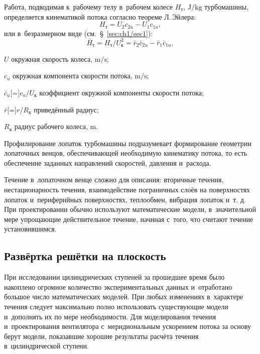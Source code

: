 Работа, подводимая к~рабочему телу в~рабочем колесе \(H_\text{т}\), \(\si\joule/\si\kilogram\) турбомашины, определяется кинематикой потока согласно теореме Л.\,Эйлера:
\begin{equation}
	H_\text{т} = U_2 c_{2u} - U_1 c_{1u},
	\label{eq:HtEuler}
\end{equation}
или в~безразмерном виде (см.~\S~\ref{sec:ch1/sec1}):
\begin{equation}
	\bar{H}_\text{т} = H_\text{т}/U_\text{к}^2 = \bar{r}_2 \bar{c}_{2u} - \bar{r}_1 \bar{c}_{1u},
	\label{eq:H_t}
\end{equation}
\begin{eqexpl}
	\item{\(U\)} окружная скорость колеса, \(\si\meter/\si\second\);
	\item{\(c_{u}\)} окружная компонента скорости потока, \(\si\meter/\si\second\);
	\item{\(\bar{c}_{u}\)}[=]\(c_{u}/U_\text{к}\) коэффициент окружной компоненты скорости потока;
	\item{\(\bar{r}\)}[=]\(r/R_\text{к}\) приведённый радиус;
	\item{\(R_\text{к}\)} радиус рабочего колеса, \(\si\meter\).
\end{eqexpl}

Профилирование лопаток турбомашины подразумевает формирование геометрии лопаточных венцов, обеспечивающей необходимую кинематику потока, то есть обеспечение заданных направлений скоростей, давления и~расхода.

Течение в~лопаточном венце сложно для описания: вторичные течения, нестационарность течения, взаимодействие пограничных слоёв на поверхностях лопаток и~периферийных поверхностях, теплообмен, вибрация лопаток и~т. д.
При проектировании обычно используют математические модели, в~значительной мере упрощающие действительное течение, начиная с~того, что считают течение установившимся.

\subsection{Развёртка решётки на плоскость}

При исследовании цилиндрических ступеней за прошедшее время было накоплено огромное количество экспериментальных данных и~отработано большое число математических моделей.
При любых изменениях в~характере течения следует максимально полно использовать существующие модели и~дополнять их по мере необходимости.
Для моделирования течения и~проектирования вентилятора с~меридиональным ускорением потока за основу берут модели, показавшие хорошие результаты расчёта течения в~цилиндрической ступени.

